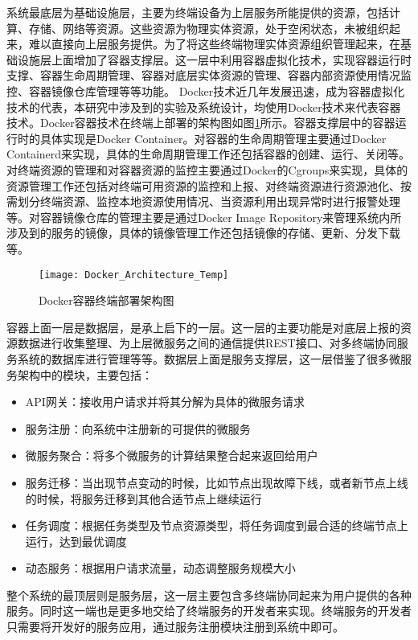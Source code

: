 系统最底层为基础设施层，主要为终端设备为上层服务所能提供的资源，包括计算、存储、网络等资源。这些资源为物理实体资源，处于空闲状态，未被组织起来，难以直接向上层服务提供。为了将这些终端物理实体资源组织管理起来，在基础设施层上面增加了容器支撑层。这一层中利用容器虚拟化技术，实现容器运行时支撑、容器生命周期管理、容器对底层实体资源的管理、容器内部资源使用情况监控、容器镜像仓库管理等等功能。
Docker技术近几年发展迅速，成为容器虚拟化技术的代表，本研究中涉及到的实验及系统设计，均使用Docker技术来代表容器技术。Docker容器技术在终端上部署的架构图如图\ref{fig:docker_architecture}所示。容器支撑层中的容器运行时的具体实现是Docker Container。对容器的生命周期管理主要通过Docker Containerd来实现，具体的生命周期管理工作还包括容器的创建、运行、关闭等。对终端资源的管理和对容器资源的监控主要通过Docker的Cgroups来实现，具体的资源管理工作还包括对终端可用资源的监控和上报、对终端资源进行资源池化、按需划分终端资源、监控本地资源使用情况、当资源利用出现异常时进行报警处理等。对容器镜像仓库的管理主要是通过Docker Image Repository来管理系统内所涉及到的服务的镜像，具体的镜像管理工作还包括镜像的存储、更新、分发下载等。
\begin{figure}[!htbp]
    \centering
    \texttt{[image: Docker\_Architecture\_Temp]}
    \caption{Docker容器终端部署架构图}
    \label{fig:docker_architecture}
\end{figure}

容器上面一层是数据层，是承上启下的一层。这一层的主要功能是对底层上报的资源数据进行收集整理、为上层微服务之间的通信提供REST接口、对多终端协同服务系统的数据库进行管理等等。数据层上面是服务支撑层，这一层借鉴了很多微服务架构中的模块，主要包括：
\begin{itemize}
    \item API网关：接收用户请求并将其分解为具体的微服务请求
    \item 服务注册：向系统中注册新的可提供的微服务
    \item 微服务聚合：将多个微服务的计算结果整合起来返回给用户
    \item 服务迁移：当出现节点变动的时候，比如节点出现故障下线，或者新节点上线的时候，将服务迁移到其他合适节点上继续运行
    \item 任务调度：根据任务类型及节点资源类型，将任务调度到最合适的终端节点上运行，达到最优调度
    \item 动态服务：根据用户请求流量，动态调整服务规模大小
\end{itemize}

整个系统的最顶层则是服务层，这一层主要包含多终端协同起来为用户提供的各种服务。同时这一端也是更多地交给了终端服务的开发者来实现。终端服务的开发者只需要将开发好的服务应用，通过服务注册模块注册到系统中即可。

